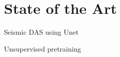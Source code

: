 \section{State of the Art}

Seismic DAS using Unet \cite{zhu2023seismic}

Unsupervised pretraining \cite{alaaDeepLstm2019}